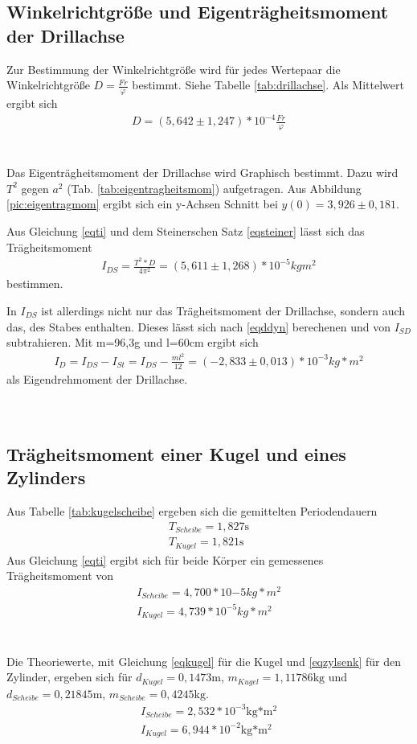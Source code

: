 \subsection{Winkelrichtgröße und Eigenträgheitsmoment der Drillachse}

Zur Bestimmung der Winkelrichtgröße wird für jedes Wertepaar die Winkelrichtgröße $D=\frac{Fr}{\varphi}$ bestimmt. Siehe Tabelle \ref{tab:drillachse}. Als Mittelwert ergibt sich
\begin{align}
D=(5,642\pm1,247)*10^{-4}\frac{Fr}{\varphi}
\end{align}
\\
\\


Das Eigenträgheitsmoment der Drillachse wird Graphisch bestimmt. Dazu wird $T^2$ gegen $a^2$ (Tab. \ref{tab:eigentragheitsmom}) aufgetragen. 
Aus Abbildung \ref{pic:eigentragmom} ergibt sich ein y-Achsen Schnitt bei $y(0)=3,926\pm 0,181$.


Aus Gleichung \ref{eqti} und dem Steinerschen Satz \ref{eqsteiner} lässt sich das Trägheitsmoment 
\begin{align}
I_{DS}=\frac{T^2*D}{4\pi^2}=(5,611\pm1,268)*10^{-5}kgm^2
\end{align}
bestimmen.

In $I_{DS}$ ist allerdings nicht nur das Trägheitsmoment der Drillachse, sondern auch das, des Stabes enthalten. Dieses lässt sich nach \ref{eqddyn} berechenen und von $I_{SD}$ subtrahieren. Mit m=96,3g und l=60cm ergibt sich
\begin{align}
I_{D}=I_{DS}-I_{St}=I_{DS}-\frac{ml^2}{12}=(-2,833\pm 0,013)*10^{-3}kg*m^2
\end{align}
als Eigendrehmoment der Drillachse.
\\
\\
\\
\subsection{Trägheitsmoment einer Kugel und eines Zylinders}

Aus Tabelle \ref{tab:kugelscheibe} ergeben sich die gemittelten Periodendauern
\begin{align*}
T_{Scheibe}=1,827\text{s}\\
T_{Kugel}=1,821\text{s}
\end{align*}
Aus Gleichung \ref{eqti} ergibt sich für beide Körper ein gemessenes Trägheitsmoment von
\begin{align}
I_{Scheibe}=4,700*10{-5}kg*m^2\\
I_{Kugel}=4,739*10^{-5}kg*m^2
\end{align}
\\
\\
Die Theoriewerte, mit Gleichung \ref{eqkugel} für die Kugel und \ref{eqzylsenk} für den Zylinder, ergeben sich für $d_{Kugel}= 0,1473\text{m}$, $m_{Kugel}=1,11786\text{kg}$ und $d_{Scheibe}=0,21845\text{m}$, $m_{Scheibe}=0,4245\text{kg}$.
\begin{align*}
I_{Scheibe}=2,532*10^{-3}\text{kg*m$^2$}\\
I_{Kugel}=6,944*10^{-2}\text{kg*m$^2$}
\end{align*}
\\
\\
\\
